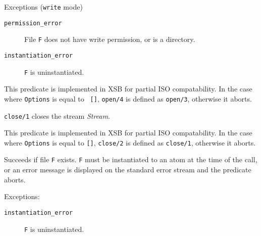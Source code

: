 \begin{description}
    Exceptions ({\tt write} mode)
    \begin {description}
    \item[{\tt permission\_error}]
	File {\tt F} does not have write permission, or is a directory.
    \item[{\tt instantiation\_error}]
	{\tt F} is uninstantiated.
    \end{description}


	This predicate is implemented in XSB for partial ISO
	compatability.  In the case where {\tt Options} is equal to {\tt
	[]}, {\tt open/4} is defined as {\tt open/3}, otherwise it
	aborts.


	{\tt close/1} closes the stream {\em Stream}.


	This predicate is implemented in XSB for partial ISO
	compatability.  In the case where {\tt Options} is equal to
	{\tt []}, {\tt close/2} is defined as {\tt close/1}, otherwise
	it aborts.

    Succeeds if file {\tt F} exists. {\tt F} must be instantiated to
    an atom at the time of the call, or an error message is displayed on
    the standard error stream and the predicate aborts.

    Exceptions:
    \begin {description}
    \item[{\tt instantiation\_error}]
	{\tt F} is uninstantiated.
    \end{description}

\end{description}


